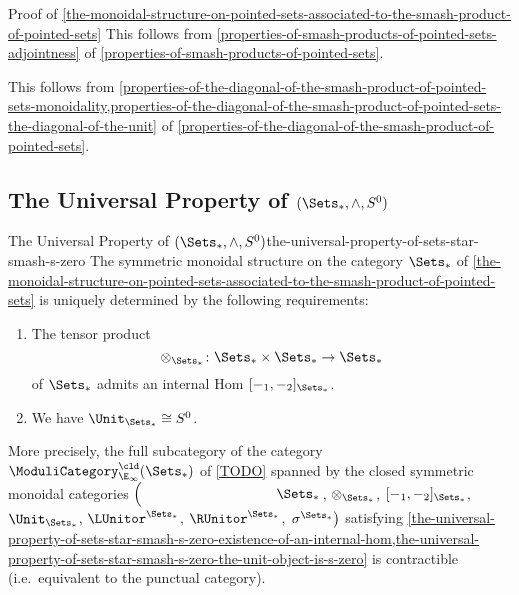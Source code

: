 \begin{Proof}{Proof of \cref{the-monoidal-structure-on-pointed-sets-associated-to-the-smash-product-of-pointed-sets}}
    This follows from \cref{properties-of-smash-products-of-pointed-sets-adjointness} of \cref{properties-of-smash-products-of-pointed-sets}.

    This follows from \cref{properties-of-the-diagonal-of-the-smash-product-of-pointed-sets-monoidality,properties-of-the-diagonal-of-the-smash-product-of-pointed-sets-the-diagonal-of-the-unit} of \cref{properties-of-the-diagonal-of-the-smash-product-of-pointed-sets}.
\end{Proof}
\subsection{The Universal Property of $(\Sets_{*},\wedge,S^{0})$}\label{subsection-the-universal-property-of-the-smash-product-of-pointed-sets}
\begin{theorem}{The Universal Property of $(\Sets_{*},\wedge,S^{0})$}{the-universal-property-of-sets-star-smash-s-zero}%
    The symmetric monoidal structure on the category $\Sets_{*}$ of \cref{the-monoidal-structure-on-pointed-sets-associated-to-the-smash-product-of-pointed-sets} is uniquely determined by the following requirements:
    \begin{enumerate}
        \item\label{the-universal-property-of-sets-star-smash-s-zero-existence-of-an-internal-hom}The tensor product
            \[
                \otimes_{\Sets_{*}}%
                \colon
                \Sets_{*}\times\Sets_{*}
                \to
                \Sets_{*}
            \]%
            of $\Sets_{*}$ admits an internal Hom $[-_{1},-_{2}]_{\Sets_{*}}$.
        \item\label{the-universal-property-of-sets-star-smash-s-zero-the-unit-object-is-s-zero}We have $\Unit_{\Sets_{*}}\cong S^{0}$.
    \end{enumerate}
    More precisely, the full subcategory of the category $\ModuliCategory^{\cld}_{\E_{\infty}}(\Sets_{*})$ of \cref{TODO} spanned by the closed symmetric monoidal categories $\left(\phantom{\mrp{\LUnitor^{\Sets_{*}}}}\Sets_{*}\right.$, $\otimes_{\Sets_{*}}$, $[-_{1},-_{2}]_{\Sets_{*}}$, $\Unit_{\Sets_{*}}$, $\LUnitor^{\Sets_{*}}$, $\RUnitor^{\Sets_{*}}$, $\left.\sigma^{\Sets_{*}}\right)$ satisfying \cref{the-universal-property-of-sets-star-smash-s-zero-existence-of-an-internal-hom,the-universal-property-of-sets-star-smash-s-zero-the-unit-object-is-s-zero} is contractible (i.e.\ equivalent to the punctual category).
\end{theorem}
